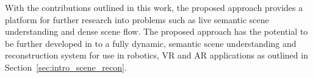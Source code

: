 With the contributions outlined in this work, the proposed approach provides a platform 
for further research into problems such as live semantic scene understanding and dense scene 
flow. The proposed approach has the potential to be further developed in to a fully dynamic, 
semantic scene understanding and reconstruction system for use in robotics, VR and AR applications 
as outlined in Section~\ref{sec:intro_scene_recon}.

